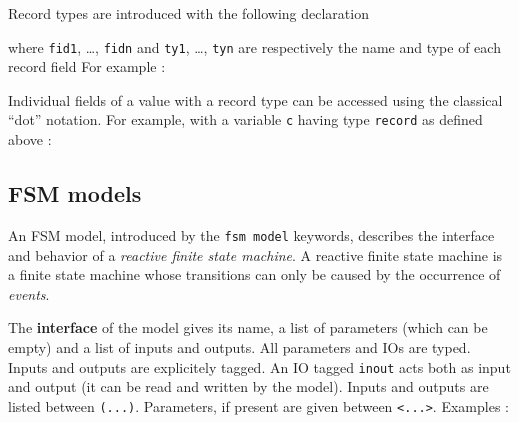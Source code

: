 \medskip
\step Record types are introduced with the following declaration
\begin{center}
\end{center}
where \verb|fid1|, \ldots, \verb|fidn| and \verb|ty1|, \ldots, \verb|tyn| are respectively the name
and type of each record field For example : 
\begin{center}
\end{center}

Individual fields of a value with a record type can be accessed using the classical ``dot''
notation. For example, with a variable \verb|c| having type \verb|record| as defined above :
\begin{center}
\end{center}


\subsection{FSM models}
\label{sec:fsm-models}

An FSM model, introduced by the \verb|fsm model| keywords, describes the interface and behavior of a
\emph{reactive finite state machine}. A reactive finite state machine is a finite state machine
whose transitions can only be caused by the occurrence of \emph{events}.

\begin{center}
\end{center}

\medskip
The \textbf{interface} of the model gives its name, a list of parameters (which can be empty) and a
list of inputs and outputs. All parameters and IOs are typed. Inputs and outputs are explicitely
tagged. An IO tagged \verb|inout| acts both as input and output (it can be read and written by the
model). Inputs and outputs are listed between \verb|(...)|. Parameters, if present are given between
\verb|<...>|. Examples :

\begin{center}
\end{center}

\begin{center}
\end{center}

